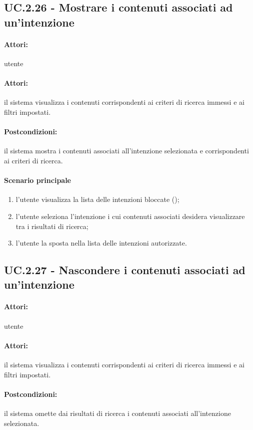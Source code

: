 \documentclass[10pt,a4paper,headinclude,footinclude,hidelinks]{scrreprt} %
\begin{document}
	\subsection[UC.2.26]{UC.2.26 - Mostrare i contenuti associati ad un'intenzione}
	\label{sec:stage:ar:uc:2_26}
	\paragraph{Attori:} utente
	\paragraph{Attori:} il sistema visualizza i contenuti corrispondenti ai criteri di ricerca immessi e ai filtri impostati.
	\paragraph{Postcondizioni:} il sistema mostra i contenuti associati all'intenzione selezionata e corrispondenti ai criteri di ricerca.
	\paragraph{Scenario principale}
	\begin{enumerate}
	\item l'utente visualizza la lista delle intenzioni bloccate ();
	\item l'utente seleziona l'intenzione i cui contenuti associati desidera visualizzare tra i risultati di ricerca;
	\item l'utente la sposta nella lista delle intenzioni autorizzate.
	\end{enumerate}

	\subsection[UC.2.27]{UC.2.27 - Nascondere i contenuti associati ad un'intenzione}
	\label{sec:stage:ar:uc:2_27}
	\paragraph{Attori:} utente
	\paragraph{Attori:} il sistema visualizza i contenuti corrispondenti ai criteri di ricerca immessi e ai filtri impostati.
	\paragraph{Postcondizioni:} il sistema omette dai risultati di ricerca i contenuti associati all'intenzione selezionata.
\end{document}
